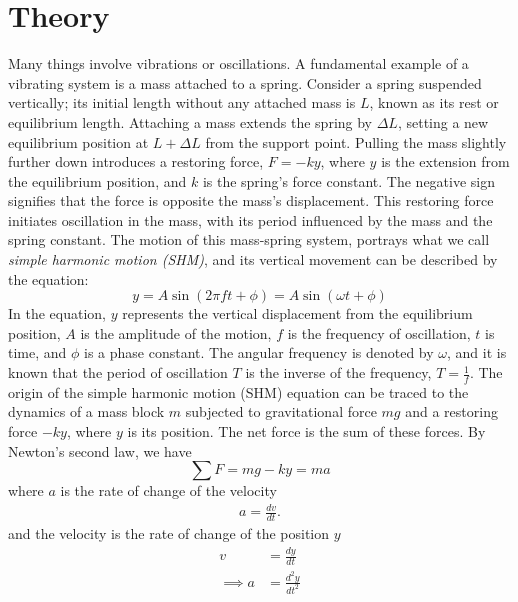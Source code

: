 \documentclass{report}
\begin{document}
\bigbreak \noindent 
\section{Theory}
\bigbreak \noindent 
Many things involve vibrations or oscillations. A fundamental example of a vibrating system is a mass attached to a spring. Consider a spring suspended vertically; its initial length without any attached mass is $L$, known as its rest or equilibrium length. Attaching a mass extends the spring by $\Delta L$, setting a new equilibrium position at $L + \Delta L$ from the support point. Pulling the mass slightly further down introduces a restoring force, $F = -ky$, where $y$ is the extension from the equilibrium position, and $k$ is the spring's force constant. The negative sign signifies that the force is opposite the mass's displacement. This restoring force initiates oscillation in the mass, with its period influenced by the mass and the spring constant. The motion of this mass-spring system, portrays what we call \textit{simple harmonic motion (SHM)}, and its vertical movement can be described by the equation:
\bigbreak \noindent 
\begin{equation}
    y= A\sin{\left(2\pi ft + \phi\right)} = A\sin{\left(\omega t + \phi\right)}
\end{equation}
\bigbreak \noindent 
In the equation, $y$ represents the vertical displacement from the equilibrium position, $A$ is the amplitude of the motion, $f$ is the frequency of oscillation, $t$ is time, and $\phi$ is a phase constant. The angular frequency is denoted by $\omega$, and it is known that the period of oscillation $T$ is the inverse of the frequency, $T = \frac{1}{f}$.
\bigbreak \noindent 
The origin of the simple harmonic motion (SHM) equation can be traced to the dynamics of a mass block $m$ subjected to gravitational force $mg$ and a restoring force $-ky$, where $y$ is its position. The net force is the sum of these forces. By Newton's second law, we have
\bigbreak \noindent 
\begin{equation}
    \sum F = mg - ky = ma 
\end{equation}
\bigbreak \noindent 
where $a$ is the rate of change of the velocity
\begin{align*}
    a = \frac{dv}{dt}
.\end{align*}
\bigbreak \noindent 
and the velocity is the rate of change of the position $y$
\begin{equation}
    \begin{split}
        v &= \frac{dy}{dt} \\
        \implies a &= \frac{d^{2}y}{dt^{2}}
    \end{split}
\end{equation}
\end{document}
